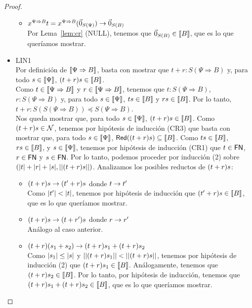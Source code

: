 \begin{proof}
\begin{itemize}
\begin{itemize}
          \item \( x^{\Psi \Rightarrow B} t = x^{\Psi \Rightarrow B} (\vec{0}_{S (\Psi)}) \rightarrow \vec{0}_{S (B)} \)
            \\ Por Lema~\ref{lem:cr} (NULL), tenemos que \( \vec{0}_{S (B)} \in \llbracket B\rrbracket \), que es lo que queríamos mostrar.
        \end{itemize}
      \item LIN1
        \\ Por definición de \( \llbracket\Psi \Rightarrow B\rrbracket \), basta con mostrar que \( t + r : S(\Psi \Rightarrow B) \) y, para todo \( s \in \llbracket\Psi\rrbracket \), \( (t + r) s \in \llbracket B\rrbracket \).
        \\ Como \( t \in \llbracket\Psi \Rightarrow B\rrbracket \) y \( r \in \llbracket\Psi \Rightarrow B\rrbracket \), tenemos que \( t : S(\Psi \Rightarrow B) \), \( r : S(\Psi \Rightarrow B) \) y, para todo \( s \in \llbracket\Psi\rrbracket \), \( t s \in \llbracket B\rrbracket \) y \( r s \in \llbracket B\rrbracket \). Por lo tanto, \( t + r : S(S(\Psi \Rightarrow B)) \preceq S(\Psi \Rightarrow B) \).
        \\ Nos queda mostrar que, para todo \( s \in \llbracket\Psi\rrbracket \), \( (t + r) s \in \llbracket B\rrbracket \). Como \( (t + r) s \in \mathcal{N} \), tenemos por hipótesis de inducción (CR3) que basta con mostrar que, para todo \( s \in \llbracket\Psi\rrbracket \), \( \mathsf{Red} ((t + r) s) \subseteq \llbracket B\rrbracket \). Como \( t s \in \llbracket B\rrbracket \), \( r s \in \llbracket B\rrbracket \), y \( s \in \llbracket\Psi\rrbracket \), tenemos por hipótesis de inducción (CR1) que \( t \in \mathsf{FN} \), \( r \in \mathsf{FN} \) y \( s \in \mathsf{FN} \). Por lo tanto, podemos proceder por inducción (2) sobre \( (|t| + |r| + |s|, ||(t + r) s||) \). Analizamos los posibles reductos de \( (t + r) s \):
        \begin{itemize}
          \item \( (t + r) s \rightarrow (t' + r) s \) donde \( t \rightarrow t' \)
          \\ Como \( |t'| < |t| \), tenemos por hipótesis de inducción que \( (t' + r) s \in \llbracket B\rrbracket \), que es lo que queríamos mostrar.
          \item \( (t + r) s \rightarrow (t + r') s \) donde \( r \rightarrow r' \)
          \\ Análogo al caso anterior.
          \item \( (t + r) (s_1 + s_2) \rightarrow (t + r) s_1 + (t + r) s_2 \)
          \\ Como \( |s_1| \leq |s| \) y \( ||(t + r) s_1|| < ||(t + r) s|| \), tenemos por hipótesis de inducción (2) que \( (t + r) s_1 \in \llbracket B\rrbracket \). Análogamente, tenemos que \( (t + r) s_2 \in \llbracket B\rrbracket \). Por lo tanto, por hipótesis de inducción, tenemos que \( (t + r) s_1 + (t + r) s_2 \in \llbracket B\rrbracket \), que es lo que queríamos mostrar.

\end{itemize}
\end{itemize}
\end{proof}
